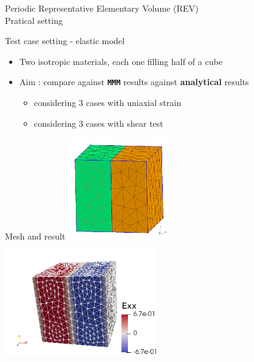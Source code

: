 \documentclass{beamer}
\newcommand{\mmm}{\texttt{MMM}}
\begin{document}
\begin{frame}{Periodic
    Representative Elementary Volume  (REV)\\\hspace*{1cm}
    Pratical setting}
  \begin{block}{Test
      case setting - elastic model}
    \protect\hypertarget{test-case-setting---elastic-model}{}
    \begin{itemize}
      \item Two isotropic materials, each one filling half of
      a cube
      \item Aim : compare against \textbf{\mmm{}}
      results against \textbf{analytical} results
      \begin{itemize}
        \item considering 3 cases with uniaxial strain
        \item considering 3 cases with shear test
      \end{itemize}
    \end{itemize}
  \end{block}
  \begin{block}{Mesh
      and result} \vspace*{-5mm}
    \includegraphics[width=0.33\textwidth]{img/cube_2mat.png}
    \includegraphics[width=0.49\textwidth]{img/cube_2mat_exx.png}
    \vspace*{-1mm}
  \end{block}
\end{frame}
\end{document}
